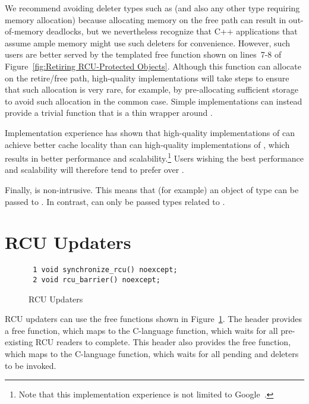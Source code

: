 \documentclass[letterpaper,10pt]{article}
\begin{document}
We recommend avoiding deleter types such as 
(and also any other type requiring memory allocation) because
allocating memory on the free path can result in out-of-memory deadlocks,
but we nevertheless recognize that C++ applications that assume ample
memory might use such deleters for convenience.
However, such users are better served by the 
templated free function shown on lines~7-8 of
Figure~\ref{fig:Retiring RCU-Protected Objects}.
Although this function can allocate on the retire/free path, high-quality
implementations will take steps to ensure that such allocation is very
rare, for example, by pre-allocating sufficient storage to avoid
such allocation in the common case.
Simple implementations can instead provide a trivial 
function that is a thin wrapper around .

Implementation experience has shown that high-quality implementations
of  can achieve better cache locality than can 
high-quality implementations of ,
which results in better performance and
scalability.\footnote{
	Note that this implementation experience is not limited to
	Google~\cite{MathieuDesnoyers2012URCU}.}
Users wishing the best performance and scalability will therefore tend
to prefer  over .

Finally,  is non-intrusive.
This means that (for example) an object of type  can be
passed to .
In contrast,  can only be passed types
related to .

\section{RCU Updaters}
\label{sec:RCU Updaters}

\begin{figure}[tbp]
{ \scriptsize
\begin{verbatim}
 1 void synchronize_rcu() noexcept;
 2 void rcu_barrier() noexcept;
\end{verbatim}
}
\caption{RCU Updaters}
\label{fig:RCU Updaters}
\end{figure}

RCU updaters can use the free functions shown in
Figure~\ref{fig:RCU Updaters}.
The  header provides a  free function,
which maps to the C-language  function, which
waits for all pre-existing RCU readers to complete.
This header also provides the  free function,
which maps to the C-language  function,
which waits for all pending  and 
deleters to be invoked.
\end{document}
